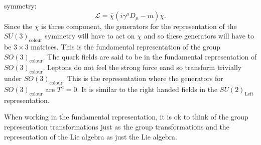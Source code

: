 symmetry:
\begin{equation}
  \mathcal{L} = \bar{\chi}\left(i\gamma^\mu D_\mu -m\right)\chi.
\end{equation}
Since the $\chi$ is three component, the generators for the representation of
the $SU(3)_\mathrm{colour}$ symmetry will have to act on $\chi$ and so these
generators will have to be $3\times 3$ matrices. This is the fundamental
representation
of the group $SO(3)_\mathrm{colour}$. The quark fields are said to be in the
fundamental representation of $SO(3)_\mathrm{colour}$. Leptons do not feel the
strong force eand so transform trivially under $SO(3)_\mathrm{colour}$. This is
the representation where the generators for $SO(3)_\mathrm{colour}$ are
$T^a=0$. It is similar to the right handed fields in the $SU(2)_\mathrm{Left}$
representation.
\par When working in the fundamental representation, it is ok to think of the 
group representation transformations just as the group transformations and the
representation of the Lie algebra as just the Lie algebra.
